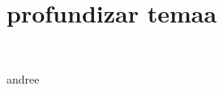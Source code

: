 \section{profundizar temaa} 
\textbf{}\\
\begin{flushleft}


\begin{itemize}


andree

	


\end{itemize} 


\end{flushleft}
